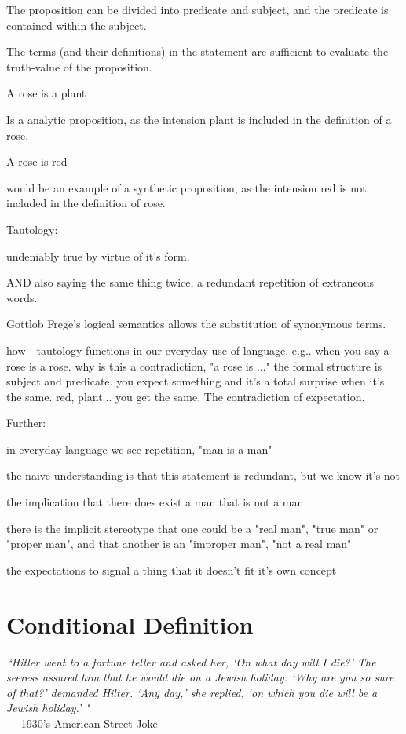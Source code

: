 The proposition can be divided into predicate and subject, and the predicate is contained within the subject.

The terms (and their definitions) in the statement are sufficient to evaluate the truth-value of the proposition.

A rose is a plant

Is a analytic proposition, as the intension plant is included in the definition of a rose.

A rose is red

would be an example of a synthetic proposition, as the intension red is not included in the definition of rose.

Tautology: 

undeniably true by virtue of it's form.

AND also saying the same thing twice, a redundant repetition of extraneous words.


Gottlob Frege's logical semantics allows the substitution of synonymous terms.

how - tautology functions in our everyday use of language, e.g.. when you say a rose is a rose. why is this a contradiction, "a rose is ..." the formal structure is subject and predicate. you expect something and it's a total surprise when it's the same. red, plant... you get the same. The contradiction of expectation.

Further:

in everyday language we see repetition, "man is a man"

the naive understanding is that this statement is redundant, but we know it's not

the implication that there does exist a man that is not a man

there is the implicit stereotype that one could be a "real man", "true man" or "proper man", and that another is an "improper man", "not a real man"

the expectations to signal a thing that it doesn't fit it's own concept

\newpage
\section{Conditional Definition}

\begin{center}
\textit{``Hitler went to a fortune teller and asked her, `On what day will I die?' The seeress assured him that he would die on a Jewish holiday. `Why are you so sure of that?' demanded Hilter. `Any day,' she replied, `on which you die will be a Jewish holiday.' "}
\\ --- 1930's American Street Joke
\end{center}

